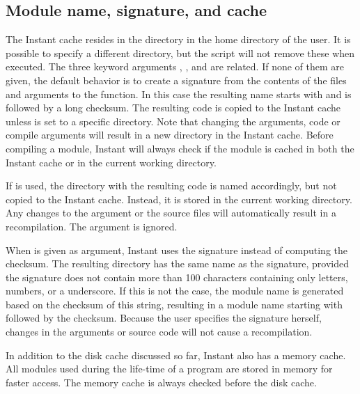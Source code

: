 \subsection{Module name, signature, and cache}\label{wilbers:sec:msc}
The Instant cache resides in the directory  in the
home directory of the user. It is possible to specify a different directory, but the
 script will not remove these when executed.
The three keyword arguments , , and
 are related. If none of them are given, the default behavior is to
create a signature from the contents of the files and arguments to the
 function. In this case the resulting name starts with
 and is followed by a long checksum. The
resulting code is copied to the Instant cache unless  is set to
a specific directory. Note that changing the arguments, code or compile arguments will
result in a new directory in the Instant cache. 
Before compiling a module, Instant will always check if the module is cached
in both the Instant cache or in the current working directory.

If  is used, the directory with the resulting code is named
accordingly, but not copied to the Instant cache. Instead, it is stored in the
current working directory. Any changes to the argument or the source files
will automatically result in a recompilation. The argument  is
ignored.

When  is given as argument, Instant uses the signature instead of
computing the checksum. The resulting directory has the same name as the
signature, provided the signature does not contain more than 100 characters
containing only letters, numbers, or a underscore. If this is not 
the case, the module name is generated based on the checksum of
this string, resulting in a module name starting with 
followed by the checksum. Because the user specifies the
signature herself, changes in the arguments or source code will not cause a
recompilation. 

In addition to the disk cache discussed so far, Instant also has a memory
cache. All modules used during the life-time of a program are stored in
memory for faster access. The memory cache is always checked before the disk
cache.



